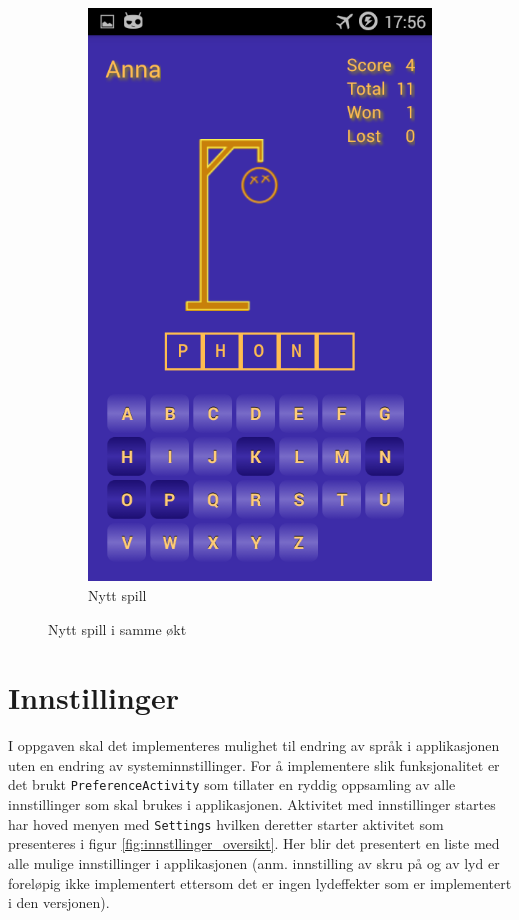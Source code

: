 \begin{figure}[ht]
\begin{subfigure}[b]{0.25\textwidth}
        \includegraphics[width=\textwidth]{./img/bruksanvisning/6.png}
        \caption{Nytt spill}
        \label{fig:nyt_spill_samme_okt}
    \end{subfigure}
    \caption{Nytt spill i samme økt}\label{fig:new_game_activities}
\end{figure}


\section{Innstillinger}
I oppgaven skal det implementeres mulighet til endring av språk i applikasjonen uten en endring av systeminnstillinger. For å implementere slik funksjonalitet er det brukt \texttt{PreferenceActivity} som tillater en ryddig oppsamling av alle innstillinger som skal brukes i applikasjonen. Aktivitet med innstillinger startes har hoved menyen med \texttt{Settings} hvilken deretter starter aktivitet som presenteres i figur \ref{fig:innstllinger_oversikt}. Her blir det presentert en liste med alle mulige innstillinger i applikasjonen (anm. innstilling av skru på og av lyd er foreløpig ikke implementert ettersom det er ingen lydeffekter som er implementert i den versjonen). 

